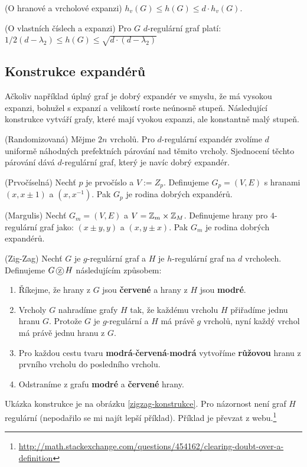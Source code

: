 \poz (O hranové a vrcholové expanzi) $h_v(G) \leq h(G) \leq d \cdot h_v(G)$.

\vt (O vlastních číslech a expanzi) Pro $G$ $d$-regulární graf platí: $1/2(d - 
\lambda_2) \leq h(G) \leq \sqrt{d \cdot (d - \lambda_2)}$

\subsection{Konstrukce expandérů}

Ačkoliv například úplný graf je dobrý expandér ve smyslu, že má vysokou 
expanzi, bohužel s expanzí a velikostí roste neúnosně stupeň. Následující 
konstrukce vytváří grafy, které mají vyokou expanzi, ale konstantně malý 
stupeň.

\vt (Randomizovaná) Mějme $2n$ vrcholů. Pro $d$-regulární expandér zvolíme $d$ 
uniformě náhodných prefektních párování nad těmito vrcholy. Sjednocení těchto 
párování dává $d$-regulární graf, který je navíc dobrý expandér.

\vt (Prvočíselná) Nechť $p$ je prvočíslo a $V:=Z_p$. Definujeme $G_p=(V,E)$ s 
hranami $(x, x\pm 1)$ a $(x,x^{-1})$. Pak $G_p$ je rodina dobrých expandérů.

\vt (Margulis) Nechť $G_m=(V,E)$ a $V=\mathbb{Z}_m \times \mathbb{Z}_M$. Definujeme hrany pro 
$4$-regulární graf jako: $(x\pm y, y)$ a $(x,y\pm x)$. Pak $G_m$ je rodina 
dobrých expandérů.

\df (Zig-Zag) Nechť $G$ je $g$-regulární graf a $H$ je $h$-regulární graf na $d$ 
vrcholech. Definujeme $G \zz H$ následujícím způsobem:
\begin{enumerate}
	\item Říkejme, že hrany z $G$ jsou {\bf\color{red}červené} a hrany z $H$ 
		jsou {\bf\color{blue}modré}.
	\item Vrcholy $G$ nahradíme grafy $H$ tak, že každému vrcholu $H$ přiřadíme 
	jednu hranu $G$. Protože $G$ je $g$-regulární a $H$ má právě $g$ vrcholů, 
	nyní každý vrchol má právě jednu hranu z $G$.
	\item Pro každou cestu tvaru 
		{\bf\color{blue}modrá}-{\bf\color{red}červená}-{\bf\color{blue}modrá} 
		vytvoříme {\bf\color{magenta}růžovou} hranu z prvního vrcholu do 
		posledního vrcholu.
	\item Odstraníme z grafu {\bf\color{blue}modré} a {\bf\color{red}červené} 
		hrany.
\end{enumerate}
Ukázka konstrukce je na obrázku \ref{zigzag-konstrukce}. Pro názornost není
graf $H$ regulární (nepodařilo se mi najít lepší příklad). Příklad je převzat z
webu.\footnote{\url{http://math.stackexchange.com/questions/454162/clearing-doubt-over-a-definition}}

